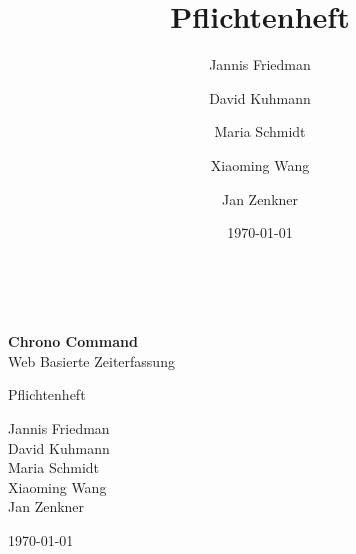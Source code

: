 \documentclass{scrartcl}
\begin{document}
\setlength{\parindent}{0pt}

\begin{titlepage}
\begin{center}
\begin{minipage}{0.4\textwidth}
\end{minipage}

\begin{minipage}{0.4\textwidth}
\end{minipage} \\[2cm]
\end{center}

\begin{center}
	{\huge \bfseries Chrono Command}\\[0.1cm]
	{\large  Web Basierte Zeiterfassung}
\end{center}

\begin{center}
	{\Large Pflichtenheft}\\[0.5cm]
\end{center}

\begin{center}
	{Jannis Friedman \\
	David Kuhmann \\
	Maria Schmidt \\
	Xiaoming Wang \\
	Jan Zenkner} \\[1cm]

\end{center}

\begin{center}
	{\large \today}
\end{center}
	
	\vfill
	


\end{titlepage}

\iffalse
\title{Pflichtenheft}
\author{ 
	Jannis Friedman\and
	David Kuhmann\and
	Maria Schmidt\and
	Xiaoming Wang\and
	Jan Zenkner
}
\date{\today}
\end{document}
